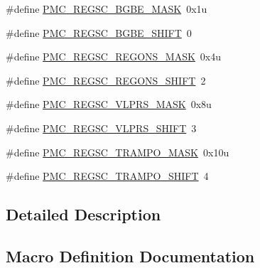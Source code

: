 \begin{DoxyCompactItemize}
\item 
\#define \hyperlink{group___p_m_c___register___masks_ga98cf5c98c133e20fb620faa6ca29d98e}{P\+M\+C\+\_\+\+R\+E\+G\+S\+C\+\_\+\+B\+G\+B\+E\+\_\+\+M\+A\+SK}~0x1u
\item 
\#define \hyperlink{group___p_m_c___register___masks_ga2e23aa8155158c86fc53ccd8baccf24d}{P\+M\+C\+\_\+\+R\+E\+G\+S\+C\+\_\+\+B\+G\+B\+E\+\_\+\+S\+H\+I\+FT}~0
\item 
\#define \hyperlink{group___p_m_c___register___masks_gab830f2c82eef6d0db7caab8ee5689ba6}{P\+M\+C\+\_\+\+R\+E\+G\+S\+C\+\_\+\+R\+E\+G\+O\+N\+S\+\_\+\+M\+A\+SK}~0x4u
\item 
\#define \hyperlink{group___p_m_c___register___masks_ga06b4e6d970f2610a635c92bb1270541d}{P\+M\+C\+\_\+\+R\+E\+G\+S\+C\+\_\+\+R\+E\+G\+O\+N\+S\+\_\+\+S\+H\+I\+FT}~2
\item 
\#define \hyperlink{group___p_m_c___register___masks_ga5af78dc068c0c69c43f749012b4c4150}{P\+M\+C\+\_\+\+R\+E\+G\+S\+C\+\_\+\+V\+L\+P\+R\+S\+\_\+\+M\+A\+SK}~0x8u
\item 
\#define \hyperlink{group___p_m_c___register___masks_ga9783786c3fc02e2420ea454dfcc63f78}{P\+M\+C\+\_\+\+R\+E\+G\+S\+C\+\_\+\+V\+L\+P\+R\+S\+\_\+\+S\+H\+I\+FT}~3
\item 
\#define \hyperlink{group___p_m_c___register___masks_gafc23413f162a7207555b876c373d6fdd}{P\+M\+C\+\_\+\+R\+E\+G\+S\+C\+\_\+\+T\+R\+A\+M\+P\+O\+\_\+\+M\+A\+SK}~0x10u
\item 
\#define \hyperlink{group___p_m_c___register___masks_gaa58b33a6b2b5c1da029a548c19699139}{P\+M\+C\+\_\+\+R\+E\+G\+S\+C\+\_\+\+T\+R\+A\+M\+P\+O\+\_\+\+S\+H\+I\+FT}~4
\end{DoxyCompactItemize}


\subsection{Detailed Description}


\subsection{Macro Definition Documentation}
